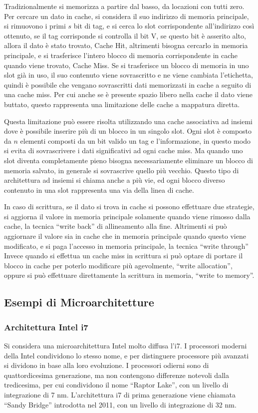\documentclass{article}
\numberwithin{equation}{subsection}
\begin{document}
Tradizionalmente si memorizza a partire dal basso, da locazioni con tutti zero. 
Per cercare un dato in cache, si considera il suo indirizzo di memoria principale, si rimuovono i primi $s$ bit di tag, e si cerca lo slot corrispondente all'indirizzo così 
ottenuto, se il tag corrisponde si controlla il bit V, se questo bit è asserito alto, allora il dato è stato trovato, Cache Hit, altrimenti bisogna cercarlo in memoria principale, e 
si trasferisce l'intero blocco di memoria corrispondente in cache quando viene trovato, Cache Miss. 
Se si trasferisce un blocco di memoria in uno slot già in uso, il suo contenuto viene sovrascritto e ne viene cambiata l'etichetta, quindi è possibile che vengano sovrascritti 
dati memorizzati in cache a seguito di una cache miss. 
Per cui anche se è presente spazio libero nella cache il dato viene buttato, questo rappresenta una limitazione delle cache a mappatura diretta. 

Questa limitazione può essere risolta utilizzando una cache associativa ad insiemi dove è possibile inserire più di un blocco in un singolo slot. Ogni slot 
è composto da $n$ elementi composti da un bit valido un tag e l'informazione, in questo modo si evita di sovrascrivere i dati 
significativi ad ogni cache miss. Ma quando uno slot diventa completamente pieno bisogna necessariamente eliminare un blocco di memoria salvato, in generale si sovrascrive 
quello più vecchio. Questo tipo di architettura ad insiemi si chiama anche a più vie, ed ogni blocco diverso contenuto in una slot rappresenta una via della linea di cache. 


In caso di scrittura, se il dato si trova in cache si possono effettuare due strategie, si aggiorna il valore in memoria principale solamente quando viene rimosso dalla cache, 
la tecnica ``write back'' di allineamento alla fine. Altrimenti si può aggiornare il valore sia in cache che in memoria principale quando questo viene modificato, e si paga 
l'accesso in memoria principale, la tecnica ``write through''
Invece quando si effettua un cache miss in scrittura si può optare di portare il blocco in cache per poterlo modificare più agevolmente, ``write allocation'', oppure si 
può effettuare direttamente la scrittura in memoria, ``write to memory''.

\subsection{Esempi di Microarchitetture}

\subsubsection{Architettura Intel i7}
\label{sec:i7}
Si considera una microarchitettura Intel molto diffusa l'i7. I processori moderni della Intel condividono lo stesso nome, e per distinguere processore più avanzati si dividono 
in base alla loro evoluzione. I processori odierni sono di quattordicesima generazione, ma non contengono differenze notevoli dalla tredicesima, per cui condividono il nome 
``Raptor Lake'', con un livello di integrazione di 7 nm. L'architettura i7 di prima generazione viene chiamata ``Sandy Bridge'' introdotta nel 2011, con un livello di 
integrazione di 32 nm. 
\end{document}
